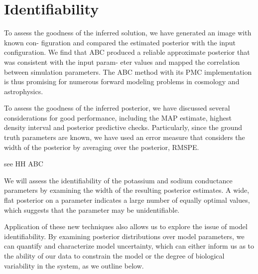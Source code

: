 \section{Identifiability}

To assess the goodness of the inferred solution, we have generated an image with known con- figuration and compared the estimated posterior with the input configuration. We find that ABC produced a reliable approximate posterior that was consistent with the input param- eter values and mapped the correlation between simulation parameters. The ABC method with its PMC implementation is thus promising for numerous forward modeling problems in cosmology and astrophysics.

To assess the goodness of the inferred posterior, we have discussed several considerations for good performance, including the MAP estimate, highest density interval and posterior predictive checks. Particularly, since the ground truth parameters are known, we have used an error measure that considers the width of the posterior by averaging over the posterior, RMSPE.

see HH ABC 

We will assess the identifiability of the potassium and sodium conductance parameters by examining the width of the resulting posterior estimates. A wide, flat posterior on a parameter indicates a large number of equally optimal values, which suggests that the parameter may be unidentifiable.

Application of these new techniques also allows us to explore the issue of model identifiability. By examining posterior distributions over model parameters, we can quantify and characterize model uncertainty, which can either inform us as to the ability of our data to constrain the model or the degree of biological variability in the system, as we outline below.

